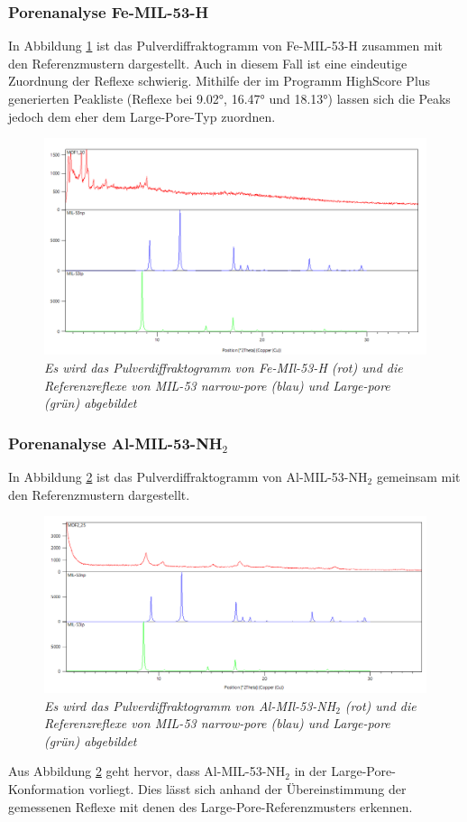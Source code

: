 \documentclass[12pt, a4paper]{article}
\begin{document}
\subsubsection{Porenanalyse Fe-MIL-53-H} \label{poreeisen}
In Abbildung \ref{MOF120ver} ist das Pulverdiffraktogramm von Fe-MIL-53-H zusammen mit den Referenzmustern dargestellt. Auch in diesem Fall ist eine eindeutige Zuordnung der Reflexe schwierig. 
Mithilfe der im Programm HighScore Plus generierten Peakliste (Reflexe bei 9.02°, 16.47° und 18.13°) lassen sich die Peaks jedoch dem eher dem Large-Pore-Typ zuordnen.
\newpage
\begin{figure}[!ht]
    \centering
    \includegraphics[scale=0.5]{MOF120ver.png}
    \caption{\textit{Es wird das Pulverdiffraktogramm von Fe-MIl-53-H (rot) und die Referenzreflexe von MIL-53 narrow-pore (blau) und Large-pore (grün) abgebildet}}
    \label{MOF120ver}
\end{figure}

\subsubsection{\texorpdfstring{Porenanalyse Al-MIL-53-NH$_2$}{Porenanalyse Al-MIL-53-NH2}}

In Abbildung \ref{MOF225ver} ist das Pulverdiffraktogramm von Al-MIL-53-NH$_2$ gemeinsam mit den Referenzmustern dargestellt. 
\begin{figure}[!h]
    \centering
    \includegraphics[scale=0.5]{MOF225ver.png}
    \caption{\textit{Es wird das Pulverdiffraktogramm von Al-MIl-53-NH$_2$ (rot) und die Referenzreflexe von MIL-53 narrow-pore (blau) und Large-pore (grün) abgebildet}}
    \label{MOF225ver}
\end{figure}
Aus Abbildung \ref{MOF225ver} geht hervor, dass Al-MIL-53-NH$_2$ in der Large-Pore-Konformation vorliegt. Dies lässt sich anhand der Übereinstimmung der gemessenen Reflexe mit denen des Large-Pore-Referenzmusters erkennen.
\end{document}
